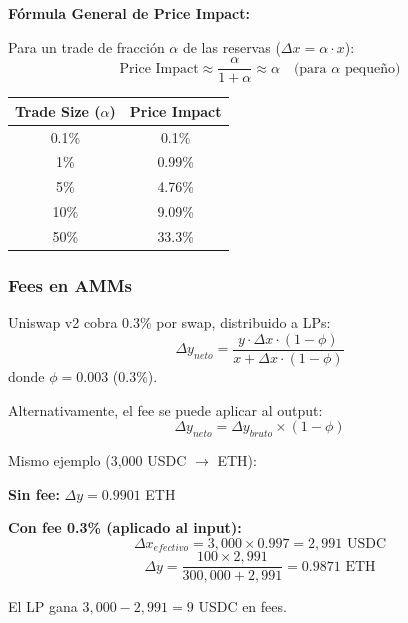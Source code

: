\documentclass[11pt,a4paper,twoside]{book}
\begin{document}
\begin{mathnote}
\textbf{F\'ormula General de Price Impact:}

Para un trade de fracci\'on $\alpha$ de las reservas ($\Delta x = \alpha \cdot x$):
\[
\text{Price Impact} \approx \frac{\alpha}{1 + \alpha} \approx \alpha \quad \text{(para } \alpha \text{ peque\~no)}
\]

\begin{center}
\begin{tabular}{cc}
\toprule
Trade Size ($\alpha$) & Price Impact \\
\midrule
0.1\% & 0.1\% \\
1\% & 0.99\% \\
5\% & 4.76\% \\
10\% & 9.09\% \\
50\% & 33.3\% \\
\bottomrule
\end{tabular}
\end{center}
\end{mathnote}

\subsubsection{Fees en AMMs}

\begin{definition}
Uniswap v2 cobra 0.3\% por swap, distribuido a LPs:
\[
\Delta y_{neto} = \frac{y \cdot \Delta x \cdot (1 - \phi)}{x + \Delta x \cdot (1 - \phi)}
\]
donde $\phi = 0.003$ (0.3\%).

Alternativamente, el fee se puede aplicar al output:
\[
\Delta y_{neto} = \Delta y_{bruto} \times (1 - \phi)
\]
\end{definition}

\begin{example}
Mismo ejemplo (3,000 USDC $\to$ ETH):

\textbf{Sin fee:} $\Delta y = 0.9901$ ETH

\textbf{Con fee 0.3\% (aplicado al input):}
\[
\Delta x_{efectivo} = 3,000 \times 0.997 = 2,991 \text{ USDC}
\]
\[
\Delta y = \frac{100 \times 2,991}{300,000 + 2,991} = 0.9871 \text{ ETH}
\]

El LP gana $3,000 - 2,991 = 9$ USDC en fees.
\end{example}
\end{document}

